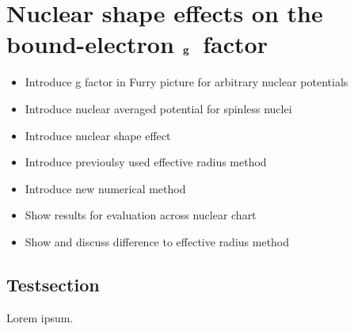 \chapter{Nuclear shape effects on the bound-electron $\bf{g}$~factor}
\label{ch:nucl_def}


\begin{itemize}
\item Introduce g factor in Furry picture for arbitrary nuclear potentials
\item Introduce nuclear averaged potential for spinless nuclei
\item Introduce nuclear shape effect
\item Introduce previoulsy used effective radius method
\item Introduce new numerical method 
\item Show results for evaluation across nuclear chart
\item Show and discuss difference to effective radius method
\end{itemize}
\newpage
\section{Testsection}
Lorem ipsum.







